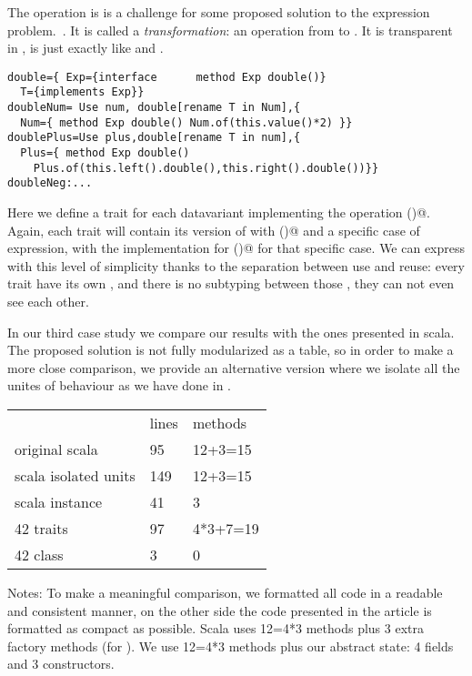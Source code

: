 The operation \Q@double@ is is a challenge for some proposed solution to the expression problem.~\cite{}.
It is called a \emph{transformation}: an operation from \Q@Exp@ to \Q@Exp@.
It is transparent in \name, is just exactly like \Q@eval@ and \Q@show@.
\begin{lstlisting}
double={ Exp={interface      method Exp double()}
  T={implements Exp}}
doubleNum= Use num, double[rename T in Num],{
  Num={ method Exp double() Num.of(this.value()*2) }}
doublePlus=Use plus,double[rename T in num],{
  Plus={ method Exp double()
    Plus.of(this.left().double(),this.right().double())}}
doubleNeg:...
\end{lstlisting}
Here we define a trait for each datavariant implementing the operation \Q@double()@.
Again, each trait will contain its version of \Q@Exp@ with \Q@double()@
and a specific case of expression, with the implementation for \Q@double()@
for that specific case.
We can express \Q@double@ with this level of simplicity
thanks to the separation between use and reuse:
every trait have its own \Q@Exp@,
and there is no subtyping between those \Q@Exp@, they can not even
see each other.

In our third case study we compare our results with the ones presented
in scala.~\cite{}
The proposed solution is not fully modularized as a table,
so in order to make a more close comparison, we provide an alternative
version where we isolate all the unites of behaviour as we
have done in \name.
\begin{minipage}{0.4\textwidth}
\begin{tabular}{l |l |l}
&                              lines  &   methods\\
original scala            & 95     &  12+3=15\\
scala  isolated units   & 149    &  12+3=15\\
scala  instance         &   41   &     3\\
42 traits               &   97   &    4*3+7=19\\
42 class                &   3    &     0\\
\end{tabular}
\end{minipage}
\begin{minipage}{0.6\textwidth}
Notes: To make a meaningful comparison, we formatted
all code in a readable and consistent manner,
on the other side the code presented in the article
is formatted as compact as possible.
Scala uses 12=4*3 methods plus 3 extra factory methods (for \Q@double@).
We use 12=4*3 methods plus our abstract state: 4 fields and 3 constructors.
\end{minipage}

